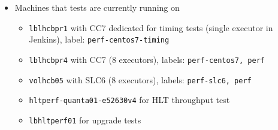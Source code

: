 {\begin{frame}[fragile]
\begin{itemize}
\begin{itemize}
\end{itemize}
\item<3-> Machines that tests are currently running on
\begin{itemize}
\scriptsize
\item<3-> \texttt{lblhcbpr1} with CC7 dedicated for timing tests (single executor in Jenkins), label: \texttt{perf-centos7-timing}
\item<3-> \texttt{lblhcbpr4} with CC7 (8 executors), labels: \texttt{perf-centos7, perf}
\item<3-> \texttt{volhcb05} with SLC6 (8 executors), labels: \texttt{perf-slc6, perf}
\item<3-> \texttt{hltperf-quanta01-e52630v4} for HLT throughput test
\item<3-> \texttt{lbhltperf01} for upgrade tests
\end{itemize}

 \end{itemize}

\end{frame}

}
